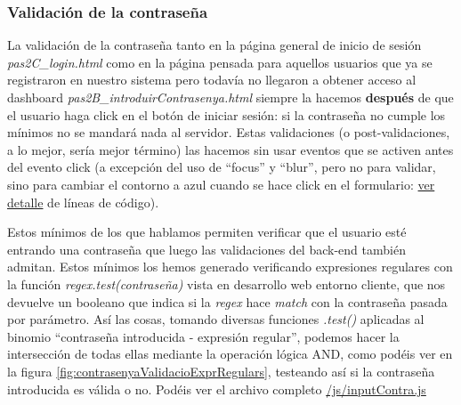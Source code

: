 \documentclass[a4paper,12pt]{report}
\begin{document}
		
		\subsubsection{Validación de la contraseña}
		
		La validación de la contraseña tanto en la página general de inicio de sesión \textit{pas2C\_login.html} como en la página pensada para aquellos usuarios que ya se registraron en nuestro sistema pero todavía no llegaron a obtener acceso al dashboard  \textit{pas2B\_introduirContrasenya.html} siempre la hacemos \textbf{después} de que el usuario haga click en el botón de iniciar sesión: si la contraseña no cumple los mínimos no se mandará nada al servidor. Estas validaciones (o post-validaciones, a lo mejor, sería mejor término) las hacemos sin usar eventos que se activen antes del evento click (a excepción del uso de ``focus'' y ``blur'', pero no para validar, sino para cambiar el contorno a azul cuando se hace click en el formulario: \href{https://github.com/blackcub3s/mercApp/blob/dc4941c33c65fb9133f4aa8ca890059243bf080d/APP%20WEB/__frontend__produccio__/app/js/inputContra.js#L45-L83}{ver detalle} de líneas de código).
		
		Estos mínimos de los que hablamos permiten verificar que el usuario esté entrando una contraseña que luego las validaciones del back-end también admitan. Estos mínimos los hemos generado verificando expresiones regulares con la función \textit{regex.test(contraseña)} vista en desarrollo web entorno cliente, que nos devuelve un booleano que indica si la \textit{regex} hace \textit{match} con la contraseña pasada por parámetro. Así las cosas, tomando diversas funciones \textit{.test()} aplicadas al binomio ``contraseña introducida - expresión regular'', podemos hacer la intersección de todas ellas mediante la operación lógica AND, como podéis ver en la figura \ref{fig:contrasenyaValidacioExprRegulars}, testeando así si la contraseña introducida es válida o no. Podéis ver el archivo completo \href{https://github.com/blackcub3s/mercApp/blob/main/APP%20WEB/__frontend__produccio__/app/js/inputContra.js}{/js/inputContra.js}
		
\end{document}
